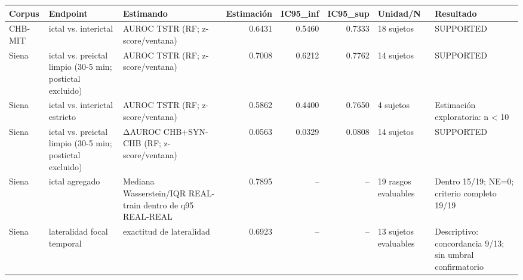 \begin{tabular}{lllrrrll}
\toprule
Corpus & Endpoint & Estimando & Estimación & IC95_inf & IC95_sup & Unidad/N & Resultado \\
\midrule
CHB-MIT & ictal vs. interictal & AUROC TSTR (RF; z-score/ventana) & 0.6431 & 0.5460 & 0.7333 & 18 sujetos & SUPPORTED \\
Siena & ictal vs. preictal limpio (30-5 min; postictal excluido) & AUROC TSTR (RF; z-score/ventana) & 0.7008 & 0.6212 & 0.7762 & 14 sujetos & SUPPORTED \\
Siena & ictal vs. interictal estricto & AUROC TSTR (RF; z-score/ventana) & 0.5862 & 0.4400 & 0.7650 & 4 sujetos & Estimación exploratoria: n < 10 \\
Siena & ictal vs. preictal limpio (30-5 min; postictal excluido) & ΔAUROC CHB+SYN-CHB (RF; z-score/ventana) & 0.0563 & 0.0329 & 0.0808 & 14 sujetos & SUPPORTED \\
Siena & ictal agregado & Mediana Wasserstein/IQR REAL-train dentro de q95 REAL-REAL & 0.7895 & -- & -- & 19 rasgos evaluables & Dentro 15/19; NE=0; criterio completo 19/19 \\
Siena & lateralidad focal temporal & exactitud de lateralidad & 0.6923 & -- & -- & 13 sujetos evaluables & Descriptivo: concordancia 9/13; sin umbral confirmatorio \\
\bottomrule
\end{tabular}
